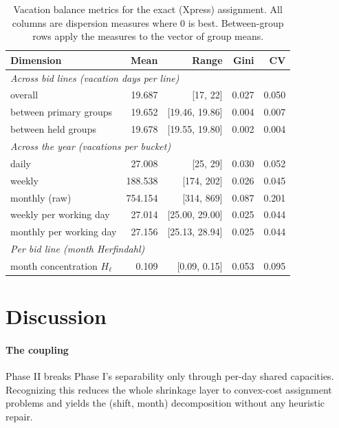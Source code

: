 \documentclass[preprint,12pt]{elsarticle}
\begin{document}
      \begin{table}[t]
         \centering
         \caption{Vacation balance metrics for the exact (Xpress) assignment. All columns are dispersion measures where $0$ is best. Between-group rows apply the measures to the vector of group means.}
         \label{tab:balance_xpress}
         \begin{tabular}{lrrrr}
         \toprule
         Dimension & Mean & Range & Gini & CV \\
         \midrule
         \multicolumn{5}{l}{\emph{Across bid lines (vacation days per line)}}\\
         \quad overall                     & 19.687 & [17, 22] & 0.027 & 0.050 \\
         \quad between primary groups      & 19.652 & [19.46, 19.86] & 0.004 & 0.007 \\
         \quad between held groups         & 19.678 & [19.55, 19.80] & 0.002 & 0.004 \\
         \multicolumn{5}{l}{\emph{Across the year (vacations per bucket)}}\\
         \quad daily                       & 27.008 & [25, 29] & 0.030 & 0.052 \\
         \quad weekly                      & 188.538 & [174, 202] & 0.026 & 0.045 \\
         \quad monthly (raw)               & 754.154 & [314, 869] & 0.087 & 0.201 \\
         \quad weekly per working day      & 27.014 & [25.00, 29.00] & 0.025 & 0.044 \\
         \quad monthly per working day     & 27.156 & [25.13, 28.94] & 0.025 & 0.044 \\
         \multicolumn{5}{l}{\emph{Per bid line (month Herfindahl)}}\\
         \quad month concentration $H_\ell$ & 0.109 & [0.09, 0.15] & 0.053 & 0.095 \\
         \bottomrule
         \end{tabular}
      \end{table}

\section{Discussion}
   \paragraph{The coupling} Phase II breaks Phase I's separability only through per-day shared capacities. Recognizing this reduces the whole shrinkage layer to convex-cost assignment problems and yields the (shift, month) decomposition without any heuristic repair.
\end{document}
